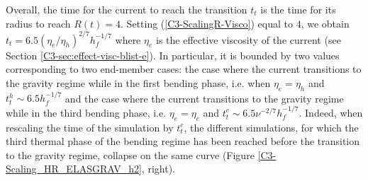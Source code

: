 Overall, the time for the current to reach the transition $t_t$ is the
time    for     its    radius     to    reach     $R(t)=4$.    Setting
(\ref{C3-ScalingR-Visco})     equal     to      $4$,     we     obtain
$t_t=6.5(\eta_e/\eta_h)^{2/7}h_f^{-1/7}$   where   $\eta_e$   is   the
effective     viscosity     of     the    current     (see     Section
\ref{C3-sec:effect-visc-blist-e}).   In particular,  it is  bounded by
two values corresponding  to two end-member cases: the  case where the
current transitions to  the gravity regime while in  the first bending
phase, i.e.  when $\eta_e= \eta_h$  and $t_t^h \sim 6.5h_f^{-1/7}$ and
the case where the current transitions  to the gravity regime while in
the    third   bending    phase,    i.e.     $\eta_e=   \eta_c$    and
$t_t^c \sim 6.5\nu^{-2/7}h_f^{-1/7}$.  Indeed, when rescaling the time
of the simulation by $t_t^c$, the different simulations, for which the
third thermal phase of the bending  regime has been reached before the
transition to the  gravity regime, collapse on the  same curve (Figure
\ref{C3-Scaling_HR_ELASGRAV_h2}, right).

